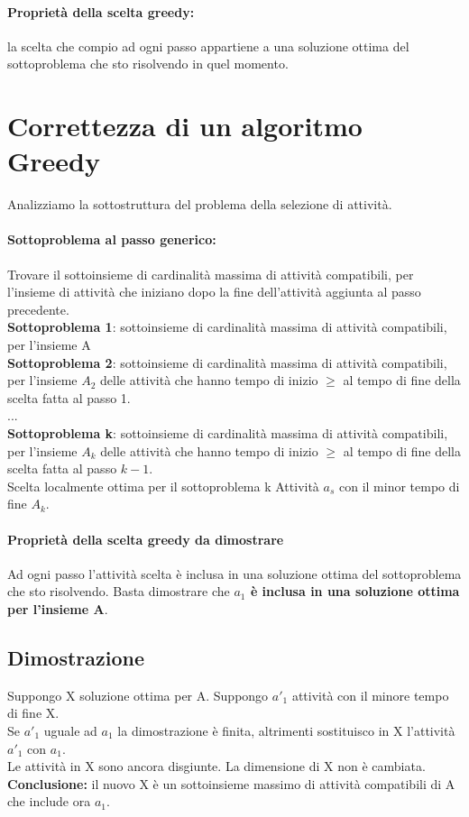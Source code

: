\paragraph*{Proprietà della scelta greedy:} la scelta che compio ad ogni passo appartiene a una soluzione
ottima del sottoproblema che sto risolvendo in quel momento.
\section{Correttezza di un algoritmo Greedy}
Analizziamo la sottostruttura del problema della selezione di attività.
\paragraph*{Sottoproblema al passo generico:} Trovare il sottoinsieme di cardinalità massima di
attività compatibili, per l'insieme di attività che iniziano dopo la fine dell'attività aggiunta al passo
precedente.\\
\textbf{Sottoproblema 1}: sottoinsieme di cardinalità massima di attività compatibili,
per l'insieme A\\
\textbf{Sottoproblema 2}: sottoinsieme di cardinalità massima di attività compatibili, per 
l'insieme $A_2$ delle attività che hanno tempo di inizio $\geq$ al tempo di fine della
scelta fatta al passo 1.\\
...\\
\textbf{Sottoproblema k}: sottoinsieme di cardinalità massima di attività compatibili,
per l'insieme $A_k$ delle attività che hanno tempo di inizio $\geq$ al tempo di fine della
scelta fatta al passo $k-1$.\\
Scelta localmente ottima per il sottoproblema k \ra Attività $a_s$ con il minor tempo di fine
$A_k$.
\paragraph*{Proprietà della scelta greedy da dimostrare}
Ad ogni passo l'attività scelta è inclusa in una soluzione ottima del sottoproblema che sto risolvendo.
Basta dimostrare che \textbf{$a_1$ è inclusa in una soluzione ottima per l'insieme A}.\\
\subsection*{Dimostrazione}
Suppongo X soluzione ottima per A. Suppongo $a'_1$ attività con il minore tempo di fine X.\\
Se $a'_1$ uguale ad $a_1$ la dimostrazione è finita, altrimenti sostituisco in X l'attività
$a'_1$ con $a_1$.\\
Le attività in X sono ancora disgiunte. La dimensione di X non è cambiata.\\
\textbf{Conclusione:} il nuovo X è un sottoinsieme massimo di attività compatibili di A che include
ora $a_1$. 
